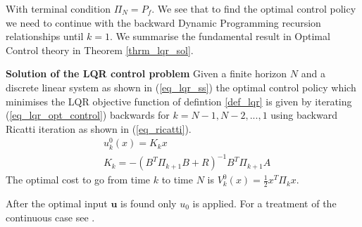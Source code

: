 \documentclass[../masters.tex]{subfiles}
\begin{document}
With terminal condition $\Pi_N = P_f$. We see that to find the optimal control policy we need to continue with the backward Dynamic Programming recursion relationships until $k = 1$. We summarise the fundamental result in Optimal Control theory in Theorem \ref{thrm_lqr_sol}.
\begin{thrm}
\textbf{Solution of the LQR control problem} Given a finite horizon $N$ and a discrete linear system as shown in (\ref{eq_lqr_ss}) the optimal control policy which minimises the LQR objective function of defintion \ref{def_lqr} is given by iterating (\ref{eq_lqr_opt_control}) backwards for $k=N-1, N-2, ..., 1$ using backward Ricatti iteration as shown in (\ref{eq_ricatti}). 
\begin{equation}
\begin{aligned}
&u^0_{k}(x) = K_{k}x \\
&K_k = -(B^T\Pi_{k+1}B+R)^{-1}B^T\Pi_{k+1}A
\end{aligned}
\label{eq_lqr_opt_control}
\end{equation}
The optimal cost to go from time $k$ to time $N$ is $V^0_{k}(x)=\frac{1}{2}x^T\Pi_{k}x$.
\label{thrm_lqr_sol}
\end{thrm}
After the optimal input $\mathbf{u}$ is found only $u_0$ is applied. For a treatment of the continuous case see \cite{robust}.
\end{document}
